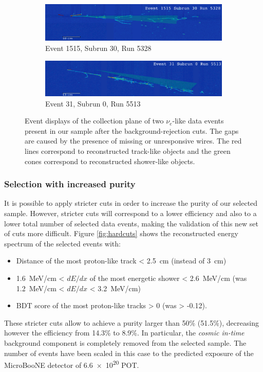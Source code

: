 \begin{figure}[htbp]
\centering
  \begin{subfigure}{0.7\textwidth}
  \includegraphics[width=\linewidth]{figures/data1.png}
    \caption{Event 1515, Subrun 30, Run 5328}
\end{subfigure}
  \begin{subfigure}{0.7\textwidth}	
  \includegraphics[width=\linewidth]{figures/data2.png}
  \caption{Event 31, Subrun 0, Run 5513}
\end{subfigure}

  \caption{Event displays of the collection plane of two $\nu_{e}$-like data events present in our sample after the background-rejection cuts. The gaps are caused by the presence of missing or unresponsive wires. The red lines correspond to reconstructed track-like objects and the green cones correspond to reconstructed shower-like objects. }
  \label{fig:evds}
\end{figure}

\subsubsection{Selection with increased purity}
It is possible to apply stricter cuts in order to increase the purity of our selected sample. However, stricter cuts will correspond to a lower efficiency and also to a lower total number of selected data events, making the validation of this new set of cuts more difficult.
Figure \ref{fig:hardcuts} shows the reconstructed energy spectrum of the selected events with:
\begin{itemize}
\item Distance of the most proton-like track < 2.5~cm (instead of 3~cm)
\item 1.6~MeV/cm < $dE/dx$ of the most energetic shower < 2.6~MeV/cm (was 1.2~MeV/cm < $dE/dx$ < 3.2~MeV/cm)
\item BDT score of the most proton-like tracks > 0 (was > -0.12).
\end{itemize}
These stricter cuts allow to achieve a purity larger than 50\% (51.5\%), decreasing however the efficiency from 14.3\% to 8.9\%. In particular, the \emph{cosmic in-time} background component is completely removed from the selected sample.
The number of events have been scaled in this case to the predicted exposure of the MicroBooNE detector of \num{6.6e20} POT. 


